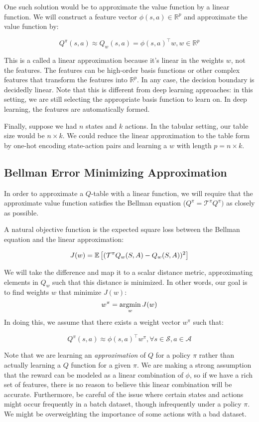 \documentclass[11pt]{article}
\begin{document}
One such solution would be to approximate the value function by a linear function. We will construct a feature vector $\phi(s, a) \in \mathbb{R}^p$ and approximate the value function by:

$$Q^\pi(s, a) \approx Q_w(s, a) = \phi(s, a)^\top w, w \in \mathbb{R}^p$$

This is a called a linear approximation because it's linear in the weights $w$, not the features. The features can be high-order basis functions or other complex features that transform the features into $\mathbb{R}^p$. In any case, the decision boundary is decidedly linear. Note that this is different from deep learning approaches: in this setting, we are still selecting the appropriate basis function to learn on. In deep learning, the features are automatically formed.

Finally, suppose we had $n$ states and $k$ actions. In the tabular setting, our table size would be $n \times k$. We could reduce the linear approximation to the table form by one-hot encoding state-action pairs and learning a $w$ with length $p = n \times k$.

\subsection{Bellman Error Minimizing Approximation}

In order to approximate a $Q$-table with a linear function, we will require that the approximate value function satisfies the Bellman equation ($Q^\pi = \mathcal{T}^\pi Q^\pi)$ as closely as possible.

A natural objective function is the expected square loss between the Bellman equation and the linear approximation:

$$J(w) = \mathbb{E}\left[ (\mathcal{T}^\pi Q_w(S,A) - Q_w(S,A))^2 \right]$$

We will take the difference and map it to a scalar distance metric, approximating elements in $Q_w$ such that this distance is minimized. In other words, our goal is to find weights $w$ that minimize $J(w)$:
$$w^\pi = \operatorname*{argmin}_w J(w)$$
In doing this, we assume that there exists a weight vector $w^\pi$ such that:

$$Q^\pi(s, a) \approx \phi(s, a)^\top w^\pi, \forall s \in \mathcal{S}, a \in \mathcal{A}$$

Note that we are learning an \textit{approximation} of $Q$ for a policy $\pi$ rather than actually learning a $Q$ function for a given $\pi$. We are making a strong assumption that the reward can be modeled as a linear combination of $\phi$, so if we have a rich set of features, there is no reason to believe this linear combination will be accurate. Furthermore, be careful of the issue where certain states and actions might occur frequently in a batch dataset, though infrequently under a policy $\pi$. We might be overweighting the importance of some actions with a bad dataset.
\end{document}
